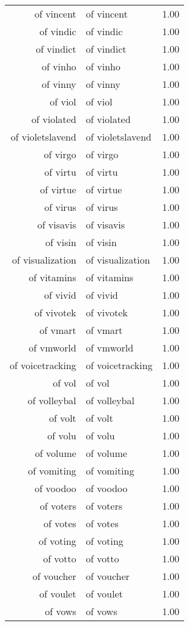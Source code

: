 \begin{table}[ht]
\begin{tabular}{rlr}
  of vincent & of vincent & 1.00 \\ 
  of vindic & of vindic & 1.00 \\ 
  of vindict & of vindict & 1.00 \\ 
  of vinho & of vinho & 1.00 \\ 
  of vinny & of vinny & 1.00 \\ 
  of viol & of viol & 1.00 \\ 
  of violated & of violated & 1.00 \\ 
  of violetslavend & of violetslavend & 1.00 \\ 
  of virgo & of virgo & 1.00 \\ 
  of virtu & of virtu & 1.00 \\ 
  of virtue & of virtue & 1.00 \\ 
  of virus & of virus & 1.00 \\ 
  of visavis & of visavis & 1.00 \\ 
  of visin & of visin & 1.00 \\ 
  of visualization & of visualization & 1.00 \\ 
  of vitamins & of vitamins & 1.00 \\ 
  of vivid & of vivid & 1.00 \\ 
  of vivotek & of vivotek & 1.00 \\ 
  of vmart & of vmart & 1.00 \\ 
  of vmworld & of vmworld & 1.00 \\ 
  of voicetracking & of voicetracking & 1.00 \\ 
  of vol & of vol & 1.00 \\ 
  of volleybal & of volleybal & 1.00 \\ 
  of volt & of volt & 1.00 \\ 
  of volu & of volu & 1.00 \\ 
  of volume & of volume & 1.00 \\ 
  of vomiting & of vomiting & 1.00 \\ 
  of voodoo & of voodoo & 1.00 \\ 
  of voters & of voters & 1.00 \\ 
  of votes & of votes & 1.00 \\ 
  of voting & of voting & 1.00 \\ 
  of votto & of votto & 1.00 \\ 
  of voucher & of voucher & 1.00 \\ 
  of voulet & of voulet & 1.00 \\ 
  of vows & of vows & 1.00 \\ 

\end{tabular}
\end{table}
